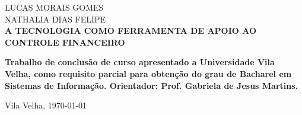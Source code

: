 ﻿
\begin{center}

    {\large LUCAS MORAIS GOMES \\ NATHALIA DIAS FELIPE\\}
    \vspace{8cm}
    {\Large \textsc\textbf{{A TECNOLOGIA COMO FERRAMENTA DE APOIO AO CONTROLE FINANCEIRO} }\\}
    \vspace{1cm}
    \hspace{.45\linewidth}
    \begin{minipage}{.50\linewidth}

            \textbf{Trabalho de conclusão de curso apresentado a Universidade Vila Velha, como requisito parcial para obtenção do grau de Bacharel em Sistemas de Informação. Orientador: Prof. Gabriela de Jesus Martins. }

           
    
    \end{minipage}

    \vspace{2cm}
    \vfill
    {\large Vila Velha, \today{}}
\end{center}

